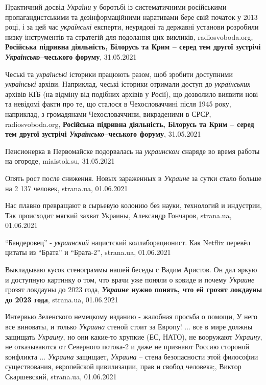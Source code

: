 Практичний досвід \emph{України} у боротьбі із систематичними російськими
пропагандистськими та дезінформаційними наративами бере свій початок у 2013
році, і за цей час \emph{українські} експерти, неурядові та державні установи
розробили низку інструментів та стратегій для подолання цих викликів,
radiosvoboda.org, \textbf{Російська підривна діяльність, Білорусь та Крим –
серед тем другої зустрічі \emph{Українсько}–чеського форуму}, 31.05.2021

Чеські та \emph{українські} історики працюють разом, щоб зробити доступними
\emph{українські} архіви. Наприклад, чеські історики отримали доступ до
\emph{українських} архівів КҐБ (на відміну від подібних архівів у Росії), що
дозволило виявити нові та невідомі факти про те, що сталося в Чехословаччині
після 1945 року, наприклад, з громадянами Чехословаччини, викраденими в СРСР, 
radiosvoboda.org, \textbf{Російська підривна діяльність, Білорусь та Крим –
серед тем другої зустрічі \emph{Українсько}–чеського форуму}, 31.05.2021

Пенсионерка в Первомайске подорвалась на \emph{украинском} снаряде во время работы на огороде,
miaistok.su, 31.05.2021

Опять рост после снижения. Новых зараженных в \emph{Украине} за сутки стало
больше на 2 137 человек, strana.ua, 01.06.2021

Нас плавно превращают в сырьевую колонию без науки, технологий и индустрии, Так
происходит мягкий захват Украины, Александр Гончаров, strana.ua, 01.06.2021

\enquote{Бандеровец} - \emph{украинский} нацистский коллаборационист. Как
Netflix перевёл цитаты из \enquote{Брата} и \enquote{Брата-2}, strana.ua,
01.06.2021

Выкладываю кусок стенограммы нашей беседы с Вадим Аристов. Он дал яркую и
доступную картинку о том, что врачи уже поняли о ковиде и почему \emph{Украине} грозят
локдауны до 2023 года, \textbf{\emph{Украине} нужно понять, что ей грозят локдауны до 2023 года}, strana.ua, 01.06.2021

Интервью Зеленского немецкому изданию - жалобная просьба о помощи, У него все
виноваты, и только \emph{Украина} стеной стоит за Европу! ... все в мире должны
защищать \emph{Украину}, но они какие-то хрупкие (ЕС, НАТО), не вооружают
\emph{Украину}, не отказываются от Северного потока-2 и даже не признают Россию
стороной конфликта ... \emph{Украина} защищает, \emph{Украина} – стена
безопасности этой философии существования, европейской цивилизации, прав и
свобод человека;,  Виктор Скаршевский, strana.ua, 01.06.2021

